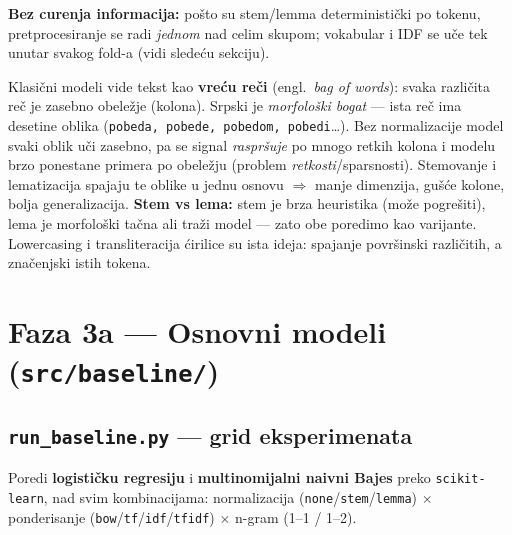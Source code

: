 \documentclass[11pt,a4paper]{article}
\newcommand{\kod}[1]{\texttt{#1}}
\begin{document}
\textbf{Bez curenja informacija:} pošto su stem/lemma deterministički po tokenu,
pretprocesiranje se radi \emph{jednom} nad celim skupom; vokabular i IDF se uče tek
unutar svakog fold-a (vidi sledeću sekciju).

\begin{teorija}
Klasični modeli vide tekst kao \textbf{vreću reči} (engl.\ \emph{bag of words}): svaka
različita reč je zasebno obeležje (kolona). Srpski je \emph{morfološki bogat} --- ista
reč ima desetine oblika (\kod{pobeda, pobede, pobedom, pobedi}\dots). Bez normalizacije
model svaki oblik uči zasebno, pa se signal \emph{raspršuje} po mnogo retkih kolona i
modelu brzo ponestane primera po obeležju (problem \emph{retkosti}/sparsnosti).
Stemovanje i lematizacija spajaju te oblike u jednu osnovu $\Rightarrow$ manje
dimenzija, gušće kolone, bolja generalizacija. \textbf{Stem vs lema:} stem je brza
heuristika (može pogrešiti), lema je morfološki tačna ali traži model --- zato obe
poredimo kao varijante. Lowercasing i transliteracija ćirilice su ista ideja:
spajanje površinski različitih, a značenjski istih tokena.
\end{teorija}

\section{Faza 3a --- Osnovni modeli (\texttt{src/baseline/})}

\subsection{\texttt{run\_baseline.py} --- grid eksperimenata}
Poredi \textbf{logističku regresiju} i \textbf{multinomijalni naivni Bajes} preko
\kod{scikit-learn}, nad svim kombinacijama: normalizacija
(\kod{none}/\kod{stem}/\kod{lemma}) $\times$ ponderisanje
(\kod{bow}/\kod{tf}/\kod{idf}/\kod{tfidf}) $\times$ n-gram (1--1 / 1--2).
\end{document}
